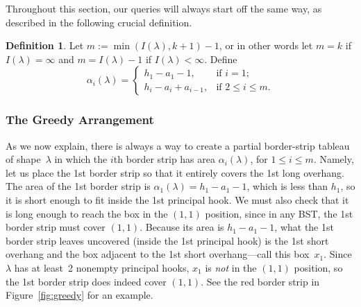 \documentclass[12pt]{article}
\theoremstyle{definition}
\newtheorem{definition}{Definition}
\begin{document}
Throughout this section,
our queries will always start off the same way,
as described in the following crucial definition.

\begin{definition}

Let $m := \min(I(\lambda),k+1) - 1$,
or in other words let $m=k$ if $I(\lambda)=\infty$
and $m=I(\lambda)-1$ if $I(\lambda)<\infty$.  Define
\begin{equation}
\label{eq:alphalambda}
\alpha_i(\lambda) =
\begin{cases}
h_1 - a_1 - 1,         &\mbox{if $i=1$;} \\
h_i - a_i + a_{i-1},   &\mbox{if $2 \le i \le m$.}
\end{cases}
\end{equation}
\end{definition}

\subsubsection{The Greedy Arrangement}

 As we now explain, there is always a way to create
a partial border-strip tableau of shape~$\lambda$
in which the $i$th border strip has area $\alpha_i(\lambda)$,
for $1 \le i \le m$.
Namely, let us place the 1st border strip so that it
entirely covers the 1st long overhang.
The area of the 1st border strip is
$\alpha_1(\lambda) = h_1 - a_1 - 1$,
which is less than $h_1$, so it is short enough to
fit inside the 1st principal hook.
We must also check that it is long enough to reach
the box in the $(1,1)$ position,
since in any BST,
the 1st border strip must cover $(1,1)$.
Because its area is $h_1 - a_1 - 1$,
what the 1st border strip leaves uncovered (inside the 1st principal hook)
is the 1st short overhang and
the box adjacent to the 1st short overhang---call this box~$x_1$.
Since $\lambda$ has at least~2 nonempty principal hooks,
$x_1$ is \emph{not} in the $(1,1)$ position,
so the 1st border strip does indeed cover $(1,1)$.
See the red border strip in Figure~\ref{fig:greedy} for an example.
\end{document}
